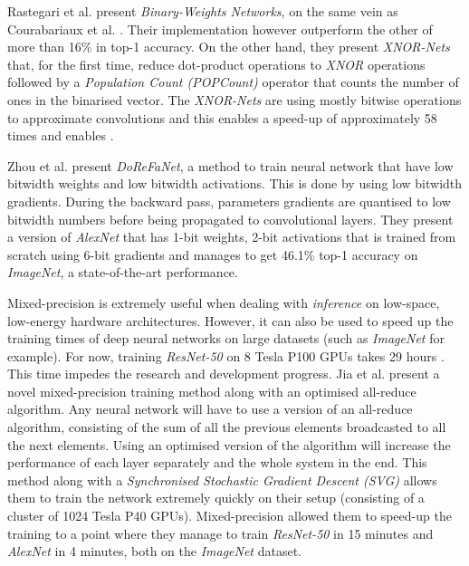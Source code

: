 Rastegari et al. \cite{Rastegari2016} present \emph{Binary-Weights Networks}, on the same vein as Courabariaux et al. \cite{Courbariaux2016}. Their implementation however outperform the other of more than 16\% in top-1 accuracy. On the other hand, they present \emph{XNOR-Nets} that, for the first time, reduce dot-product operations to \emph{XNOR} operations followed by a \emph{Population Count (POPCount)} operator that counts the number of ones in the binarised vector. The \emph{XNOR-Nets} are using mostly bitwise operations to approximate convolutions and this enables a speed-up of approximately 58 times and enables .

Zhou et al. \cite{Zhou2016} present \emph{DoReFaNet}, a method to train neural network that have low bitwidth weights and low bitwidth activations. This is done by using low bitwidth gradients. During the backward pass, parameters gradients are quantised to low bitwidth numbers before being propagated to convolutional layers. They present a version of \emph{AlexNet} that has 1-bit weights, 2-bit activations that is trained from scratch using 6-bit gradients and manages to get 46.1\% top-1 accuracy on \emph{ImageNet}, a state-of-the-art performance.

Mixed-precision is extremely useful when dealing with \emph{inference} on low-space, low-energy hardware architectures. However, it can also be used to speed up the training times of deep neural networks on large datasets (such as \emph{ImageNet} for example). For now, training \emph{ResNet-50} on 8 Tesla P100 GPUs takes 29 hours \cite{He2016}. This time  impedes the research and development progress. Jia et al. \cite{Jia2018} present a novel mixed-precision training method along with an optimised all-reduce algorithm. Any neural network will have to use a version of an all-reduce algorithm, consisting of the sum of all the previous elements broadcasted to all the next elements. Using an optimised version of the algorithm will increase the performance of each layer separately and the whole system in the end. This method along with a \emph{Synchronised Stochastic Gradient Descent (SVG)} allows them to train the network extremely quickly on their setup (consisting of a cluster of 1024 Tesla P40 GPUs). Mixed-precision allowed them to speed-up the training to a point where they manage to train \emph{ResNet-50} in 15 minutes and \emph{AlexNet} in 4 minutes, both on the \emph{ImageNet} dataset.


